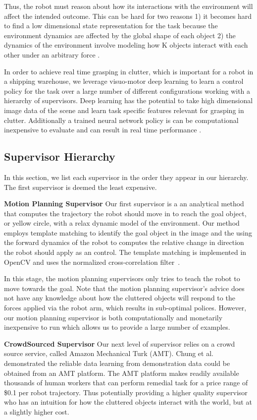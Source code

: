 \documentclass[10pt, conference]{ieeeconf}      %
\begin{document}
Thus, the robot must reason about how its interactions with the environment will affect the intended outcome. This can be hard for two reasons 1) it becomes hard to find a low dimensional state representation for the task because the environment dynamics are affected by the global shape of each object 2) the dynamics of the environment  involve modeling how K objects interact with each other under an arbitrary force \cite{kitaevphysics}.

In order to achieve real time grasping in clutter, which is important for a robot in a shipping warehouse, we leverage  visuo-motor deep learning to learn a control policy for the task over a large number of different configurations working with a hierarchy of supervisors. Deep learning has the potential to take high dimensional image data of the scene and learn task specific features relevant for grasping in clutter. Additionally a trained neural network policy is can be computational inexpensive to evaluate and can result in real time performance \cite{levine2015end}.


\subsection{Supervisor Hierarchy}\label{sec:hier}
In this section, we list each supervisor in the order they appear in our hierarchy. The first supervisor is deemed the least expensive. 

\noindent \textbf{Motion Planning Supervisor} Our first supervisor is a an analytical method that computes the trajectory the robot should move in to reach the goal object, or yellow circle, with a relax dynamic model of the environment. Our method employs template matching to identify the goal object in the image and the using the forward dynamics of the robot to computes the relative change in direction the robot should apply as an control. The template matching is implemented in OpenCV and uses the normalized cross-correlation filter~\cite{opencv_library}.

In this stage, the motion planning supervisors only tries to teach the robot to move towards the goal. Note that the motion planning supervisor's advice does not have any knowledge about how the cluttered objects will respond to the forces applied via the robot arm, which results in sub-optimal polices. However, our motion planning supervisor is both computationally and monetarily inexpensive to run which allows us to provide a large number of examples. 


\noindent \textbf{CrowdSourced Supervisor} Our next level of supervisor relies on a crowd source service, called Amazon Mechanical Turk (AMT). Chung et al. demonstrated the reliable data learning from demonstration data could be obtained from an AMT platform. The AMT platform makes readily available thousands of human workers that can perform remedial task for a price range of \$0.1 per robot trajectory\cite{chung2014accelerating}. Thus potentially providing a higher quality supervisor who has an intuition for how the cluttered objects interact with the world, but at a slightly higher cost. 
\end{document}
